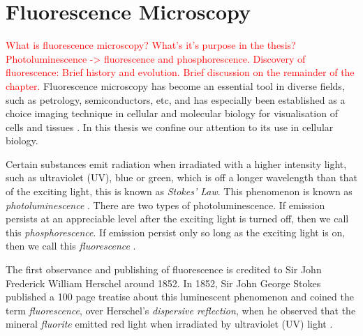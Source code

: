 
\chapter{Fluorescence Microscopy} %

\label{chap:Chapter2} %

\citep{Biehlmaier2013}
\citep{Svoboda2007}
\citep{Svoboda2009}
\citep{WuMerchantCastleman2008}
\citep{GonzalezWoods2002}
\citep{Pratt2001}
\citep{Soile2004}
\citep{Matula2006}
\citep{Rohr2010}
\citep{Matula2000}
\citep{Vu2008}
\citep{Kozubek2001}
\citep{Petran1985}

\textcolor{red}{What is fluorescence microscopy? What's it's purpose in the thesis?	Photoluminescence -> fluorescence and phosphorescence. Discovery of fluorescence: Brief history and evolution. Brief discussion on the remainder of the chapter.}
Fluorescence microscopy has become an essential tool in diverse fields, such as petrology, semiconductors, etc, and has especially been established as a choice imaging technique in cellular and molecular biology for visualisation of cells and tissues \citep{Spring2003,Danek2012,Hubeny2008,Fatima2008,Matula2012}.
In this thesis we confine our attention to its use in cellular biology.

Certain substances emit radiation when irradiated with a higher intensity light, such as ultraviolet (UV), blue or green, which is off a longer wavelength than that of the exciting light, this is known as \textit{Stokes' Law}.
This phenomenon is known as \textit{photoluminescence} \citep{Koch1972,Vaughan2015,Sarder2006,AbramowitzDavidson2016}.
There are two types of photoluminescence. If emission persists at an appreciable level after the exciting light is turned off, then we call this \textit{phosphorescence}.
If emission persist only so long as the exciting light is on, then we call this \textit{fluorescence} \citep{Koch1972,SpringDavisdson2016}.

The first observance and publishing of fluorescence is credited to Sir John Frederick William Herschel around 1852.
In 1852, Sir John George Stokes published a 100 page treatise about this luminescent phenomenon and coined the term \textit{fluorescence}, over Herschel's \textit{dispersive reflection}, when he observed that the mineral \textit{fluorite} emitted red light when irradiated by ultraviolet (UV) light \citep{Dobrucki2013,Danek2012}.

